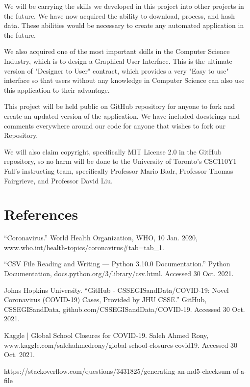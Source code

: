 \documentclass[fontsize=11pt]{article}
\begin{document}
    We will be carrying the skills we developed in this project into other projects in the future. We have now acquired the ability to download, process, and hash data. These abilities would be necessary to create any automated application in the future.

    We also acquired one of the most important skills in the Computer Science Industry, which is to design a Graphical User Interface. This is the ultimate version of "Designer to User" contract, which provides a very "Easy to use" interface so that users without any knowledge in Computer Science can also use this application to their advantage.

    This project will be held public on GitHub repository for anyone to fork and create an updated version of the application. We have included docstrings and comments everywhere around our code for anyone that wishes to fork our Repository.

    We will also claim copyright, specifically MIT License 2.0 in the GitHub repository, so no harm will be done to the University of Toronto's CSC110Y1 Fall's instructing team, specifically Professor Mario Badr, Professor Thomas Fairgrieve, and Professor David Liu.

    \newpage

    \section{References}

    “Coronavirus.” World Health Organization, WHO, 10 Jan. 2020, www.who.int/health-topics/coronavirus\#tab=tab\_1.

    “CSV File Reading and Writing — Python 3.10.0 Documentation.” Python Documentation, docs.python.org/3/library/csv.html. Accessed 30 Oct. 2021.

    Johns Hopkins University. “GitHub - CSSEGISandData/COVID-19: Novel Coronavirus (COVID-19) Cases, Provided by JHU CSSE.” GitHub, CSSEGISandData, github.com/CSSEGISandData/COVID-19. Accessed 30 Oct. 2021.

    Kaggle | Global School Closures for COVID-19. Saleh Ahmed Rony, www.kaggle.com/salehahmedrony/global-school-closures-covid19. Accessed 30 Oct. 2021.

    https://stackoverflow.com/questions/3431825/generating-an-md5-checksum-of-a-file
\end{document}

